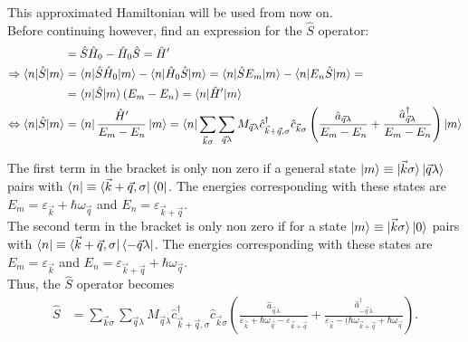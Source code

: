 \documentclass{article}
\newcommand{\lr}[1]{\left(#1\right)}
\begin{document}
{	This approximated Hamiltonian will be used from now on.\\
	Before continuing however, find an expression for the $\hat{S}$ operator:
		\begin{align*}
			[\hat{S},\hat{H}_0] &= \hat{S}\hat{H}_0 - \hat{H}_0\hat{S} = \hat{H}' \\
			\Rightarrow \braket{ n |\hat{S} | m} &= \braket{ n |\hat{S}\hat{H}_0 | m} - \braket{ n | \hat{H}_0\hat{S} | m} = \braket{ n |\hat{S} E_m | m} - \braket{ n | E_n\hat{S} | m} = \\
			&= \braket{ n |\hat{S} | m} \lr{ E_m - E_n } = \braket{ n | \hat{H}' | m } \\
			\Leftrightarrow \braket{ n | \hat{S} | m } &= \bra{n} \frac{\hat{H}'}{E_m - E_n} \ket{m} = \bra{n} \sum_{\vec{k}\sigma} \sum_{\vec{q}\lambda} M_{\vec{q}\lambda} \hat{c}_{\vec{k}+\vec{q},\sigma}^\dagger \hat{c}_{\vec{k}\sigma} \lr{ \frac{\hat{a}_{\vec{q}\lambda}}{E_m - E_n} + \frac{\hat{a}_{\vec{q}\lambda}^\dagger}{E_m - E_n} } \ket{m}
		\end{align*}
	
	The first term in the bracket is only non zero if a general state $\ket{m} \equiv \ket{\vec{k}\sigma}\ket{\vec{q}\lambda}$ pairs with $\bra{n} \equiv \bra{\vec{k}+\vec{q},\sigma}\bra{0}$. The energies corresponding with these states are $E_m = \varepsilon_{\vec{k}} + \hbar\omega_{\vec{q}}$ and $E_n = \varepsilon_{\vec{k}+\vec{q}}$.\\
	The second term in the bracket is only non zero if for a state $\ket{m} \equiv \ket{\vec{k}\sigma}\ket{0}$ pairs with $\bra{n} \equiv \bra{\vec{k}+\vec{q},\sigma}\bra{-\vec{q}\lambda}$. The energies corresponding with these states are $E_m = \varepsilon_{\vec{k}}$ and $E_n = \varepsilon_{\vec{k}+\vec{q}} + \hbar\omega_{\vec{q}}$.\\
	Thus, the $\hat{S}$ operator becomes
		\begin{align*}
			\hat{S} &= \sum_{\vec{k}\sigma}\sum_{\vec{q}\lambda} M_{\vec{q}\lambda} \hat{c}_{\vec{k}+\vec{q},\sigma}^\dagger  \hat{c}_{\vec{k}\sigma} \lr{ \frac{\hat{a}_{\vec{q}\lambda}}{\varepsilon_{\vec{k}} + \hbar\omega_{\vec{q}} - \varepsilon_{\vec{k}+\vec{q}}} + \frac{\hat{a}_{-\vec{q}\lambda}^\dagger}{\varepsilon_{\vec{k}} - (\hbar\omega_{\vec{k}+\vec{q}} + \hbar\omega_{\vec{q}}} }.
		\end{align*}
	
	
	
}
\end{document}
